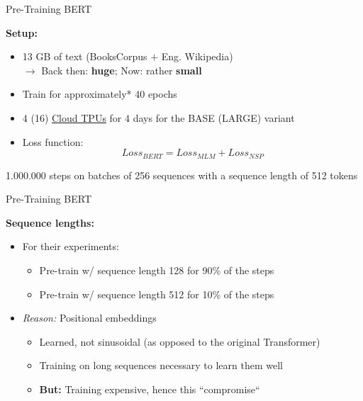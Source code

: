 \documentclass[11pt,compress,t,notes=noshow, xcolor=table]{beamer}
\begin{document}
\begin{frame}{Pre-Training BERT}

\vfill

\textbf{Setup:}

\begin{itemize}
	\item 13 GB of text (BooksCorpus $+$ Eng. Wikipedia)\\
				$\rightarrow$ Back then: \textbf{huge}; Now: rather \textbf{small}
	\item Train for approximately* 40 epochs
	\item 4 (16) \href{https://cloud.google.com/tpu/}{Cloud TPUs} for 4 days for the BASE (LARGE) variant
	\item Loss function: $$Loss_{BERT} = Loss_{MLM} + Loss_{NSP}$$
\end{itemize}

\vfill

{\scriptsize *1.000.000 steps on batches of 256 sequences with a sequence length of 512 tokens}
\end{frame}


\begin{frame}{Pre-Training BERT}

\vfill

\textbf{Sequence lengths:}

\begin{itemize}
	\item For their experiments:
		\begin{itemize}
			\item Pre-train w/ sequence length 128 for 90\% of the steps
			\item Pre-train w/ sequence length 512 for 10\% of the steps \\
		\end{itemize}
	\item \textit{Reason:} Positional embeddings
		\begin{itemize}
			\item Learned, not sinusoidal (as opposed to the original Transformer)
			\item Training on long sequences necessary to learn them well
			\item \textbf{But:} Training expensive, hence this ``compromise``
		\end{itemize}
\end{itemize}

\vfill

\end{frame}
\end{document}
